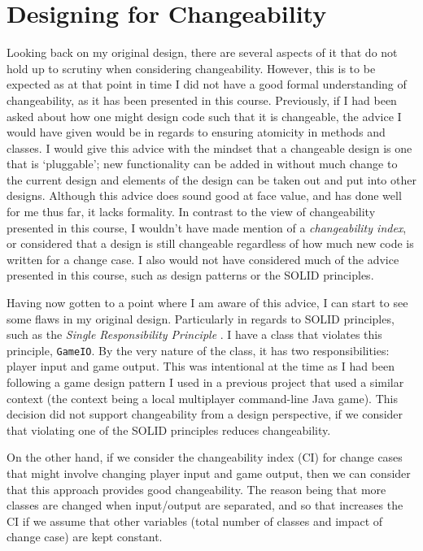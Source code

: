 \documentclass[10pt, a4paper, conference]{IEEEtran}
\begin{document}
\section{Designing for Changeability}
Looking back on my original design, there are several aspects of it that do not
hold up to scrutiny when considering changeability. However, this is to be
expected as at that point in time I did not have a good formal understanding of
changeability, as it has been presented in this course. Previously, if I had
been asked about how one might design code such that it is changeable, the
advice I would have given would be in regards to ensuring atomicity in methods
and classes. I would give this advice with the mindset that a changeable design
is one that is `pluggable'; new functionality can be added in without much
change to the current design and elements of the design can be taken out and
put into other designs. Although this advice does sound good at face value, and
has done well for me thus far, it lacks formality. In contrast to the view of
changeability presented in this course, I wouldn't have made mention of
a \textit{changeability index}, or considered that a design is still
changeable regardless of how much new code is written for a change case. I also
would not have considered much of the advice presented in this course, such as
design patterns or the SOLID principles.

Having now gotten to a point where I am aware of this advice, I can start to
see some flaws in my original design. Particularly in regards to SOLID
principles, such as the \textit{Single Responsibility Principle}
\cite{lec07-solid}. I have a class that violates this principle,
\texttt{GameIO}. By the very nature of the class, it has two responsibilities:
player input and game output. This was intentional at the time as I had been
following a game design pattern I used in a previous project that used
a similar context (the context being a local multiplayer command-line Java game).
This decision did not support changeability from a design perspective, if we
consider that violating one of the SOLID principles reduces changeability. 

On the other hand, if we consider the changeability index (CI)
\cite{lec01b-changeability} for change cases that might involve changing player
input and game output, then we can consider that this approach provides
good changeability. The reason being that more classes are changed when
input/output are separated, and so that increases the CI if we assume that
other variables (total number of classes and impact of change case) are kept
constant.
\end{document}

